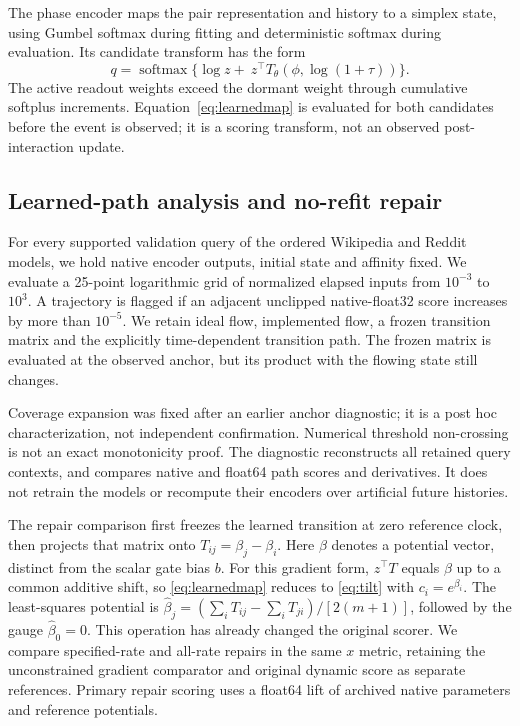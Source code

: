 The phase encoder maps the pair representation and history to a simplex state, using Gumbel softmax during fitting and deterministic softmax during evaluation. Its candidate transform has the form
\begin{equation}\label{eq:learnedmap}
q=\operatorname{softmax}\{\log z+\ z^\top T_\theta(\phi,\log(1+\tau))\}.
\end{equation}
The active readout weights exceed the dormant weight through cumulative softplus increments. Equation~\eqref{eq:learnedmap} is evaluated for both candidates before the event is observed; it is a scoring transform, not an observed post-interaction update.

\subsection{Learned-path analysis and no-refit repair}
For every supported validation query of the ordered Wikipedia and Reddit models, we hold native encoder outputs, initial state and affinity fixed. We evaluate a 25-point logarithmic grid of normalized elapsed inputs from $10^{-3}$ to $10^3$. A trajectory is flagged if an adjacent unclipped native-float32 score increases by more than $10^{-5}$. We retain ideal flow, implemented flow, a frozen transition matrix and the explicitly time-dependent transition path. The frozen matrix is evaluated at the observed anchor, but its product with the flowing state still changes.

Coverage expansion was fixed after an earlier anchor diagnostic; it is a post hoc characterization, not independent confirmation. Numerical threshold non-crossing is not an exact monotonicity proof. The diagnostic reconstructs all retained query contexts, and compares native and float64 path scores and derivatives. It does not retrain the models or recompute their encoders over artificial future histories.

The repair comparison first freezes the learned transition at zero reference clock, then projects that matrix onto $T_{ij}=\beta_j-\beta_i$. Here $\beta$ denotes a potential vector, distinct from the scalar gate bias $b$. For this gradient form,
$z^\top T$ equals $\beta$ up to a common additive shift, so \eqref{eq:learnedmap} reduces to \eqref{eq:tilt} with $c_i=e^{\beta_i}$. The least-squares potential is
$\widehat\beta_j=(\sum_iT_{ij}-\sum_iT_{ji})/[2(m+1)]$, followed by the gauge $\widehat\beta_0=0$.
This operation has already changed the original scorer. We compare specified-rate and all-rate repairs in the same $x$ metric, retaining the unconstrained gradient comparator and original dynamic score as separate references. Primary repair scoring uses a float64 lift of archived native parameters and reference potentials.


